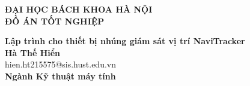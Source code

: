 \documentclass[DoAn.tex]{subfiles}
\begin{document}
\begin{titlepage}
\thispagestyle{empty}
\begin{center}

{\textbf{\large{ĐẠI HỌC BÁCH KHOA HÀ NỘI}}}\\[4cm]

{\textbf{\huge{ ĐỒ ÁN TỐT NGHIỆP}}}\\[1cm]
{\textbf{\Large{Lập trình cho thiết bị nhúng giám sát vị trí NaviTracker}}\\[1cm]

{\textbf{\large{Hà Thế Hiển}}}\\
{\large{hien.ht215575@sis.hust.edu.vn}}\\[0.5cm]

{\textbf{\large{Ngành Kỹ thuật máy tính}}}\\

\vspace{2cm}
\begin{table}[H]
\centering
{}
\end{table}}
\end{center}



\end{titlepage}
\end{document}
